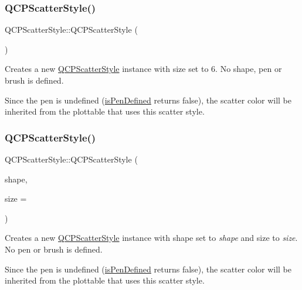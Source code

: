 \subsubsection{\texorpdfstring{Q\+C\+P\+Scatter\+Style()}{QCPScatterStyle()}\hspace{0.1cm}{\footnotesize\ttfamily [1/7]}}
{\footnotesize\ttfamily Q\+C\+P\+Scatter\+Style\+::\+Q\+C\+P\+Scatter\+Style (\begin{DoxyParamCaption}{ }\end{DoxyParamCaption})}

Creates a new \hyperlink{class_q_c_p_scatter_style}{Q\+C\+P\+Scatter\+Style} instance with size set to 6. No shape, pen or brush is defined.

Since the pen is undefined (\hyperlink{class_q_c_p_scatter_style_a47077eb6450fe9a788f833e4ec1b1d5a}{is\+Pen\+Defined} returns false), the scatter color will be inherited from the plottable that uses this scatter style. \mbox{\label{class_q_c_p_scatter_style_a003d92f74f4561eda111862eadd62f28}} 
\subsubsection{\texorpdfstring{Q\+C\+P\+Scatter\+Style()}{QCPScatterStyle()}\hspace{0.1cm}{\footnotesize\ttfamily [2/7]}}
{\footnotesize\ttfamily Q\+C\+P\+Scatter\+Style\+::\+Q\+C\+P\+Scatter\+Style (\begin{DoxyParamCaption}\item[{\hyperlink{class_q_c_p_scatter_style_adb31525af6b680e6f1b7472e43859349}{Scatter\+Shape}}]{shape,  }\item[{double}]{size = {} }\end{DoxyParamCaption})}

Creates a new \hyperlink{class_q_c_p_scatter_style}{Q\+C\+P\+Scatter\+Style} instance with shape set to {\itshape shape} and size to {\itshape size}. No pen or brush is defined.

Since the pen is undefined (\hyperlink{class_q_c_p_scatter_style_a47077eb6450fe9a788f833e4ec1b1d5a}{is\+Pen\+Defined} returns false), the scatter color will be inherited from the plottable that uses this scatter style. \mbox{\label{class_q_c_p_scatter_style_afa059da858c864c7e05871dc602d7eab}} 
